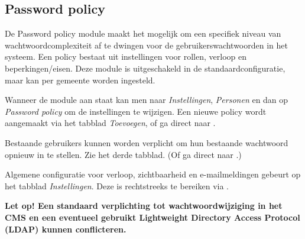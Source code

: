 \subsection{Password policy}\label{passwordpolicy}

De Password policy module maakt het mogelijk om een specifiek niveau van wachtwoordcomplexiteit af te dwingen voor de gebruikerswachtwoorden in het systeem. Een policy bestaat uit instellingen voor rollen, verloop en beperkingen/eisen. Deze module is uitgeschakeld in de standaardconfiguratie, maar kan per gemeente worden ingesteld.

Wanneer de module aan staat kan men naar \emph{Instellingen}, \emph{Personen} en dan op \emph{Password policy} om de instellingen te wijzigen. Een nieuwe policy wordt aangemaakt via het tabblad \emph{Toevoegen}, of ga direct naar .

Bestaande gebruikers kunnen worden verplicht om hun bestaande wachtwoord opnieuw in te stellen. Zie het derde tabblad. (Of ga direct naar .)

Algemene configuratie voor verloop, zichtbaarheid en e-mailmeldingen gebeurt op het tabblad \emph{Instellingen}. Deze is rechtstreeks te bereiken via .

\textbf{Let op! Een standaard verplichting tot wachtwoordwijziging in het CMS en een eventueel gebruikt Lightweight Directory Access Protocol (LDAP) kunnen conflicteren.}